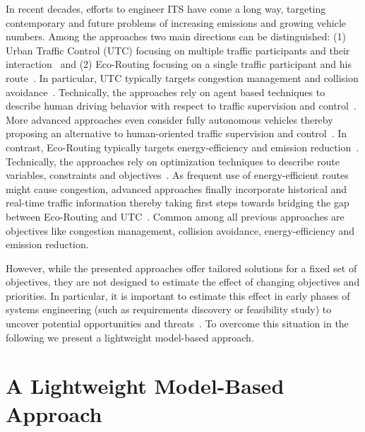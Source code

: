 \documentclass[conference]{../cls/IEEEtran}
\begin{document}
In recent decades, efforts to engineer ITS have come a long way, targeting contemporary and future problems of increasing emissions and growing vehicle numbers. Among the approaches two main directions can be distinguished: (1) Urban Traffic Control (UTC) focusing on multiple traffic participants and their interaction~\cite{Chen2010,Dresner2008} and (2) Eco-Routing focusing on a single traffic participant and his route~\cite{Ericsson2006,Boriboonsomsin2012}. In particular, UTC typically targets congestion management and collision avoidance~\cite{Chen2010}. Technically, the approaches rely on agent based techniques to describe human driving behavior with respect to traffic supervision and control~\cite{Chen2010}. More advanced approaches even consider fully autonomous vehicles thereby proposing an alternative to human-oriented traffic supervision and control~\cite{Dresner2008}. In contrast, Eco-Routing typically targets energy-efficiency and emission reduction~\cite{Ericsson2006}. Technically, the approaches rely on optimization techniques to describe route variables, constraints and objectives~\cite{Ericsson2006}. As frequent use of energy-efficient routes might cause congestion, advanced approaches finally incorporate historical and real-time traffic information thereby taking first steps towards bridging the gap between Eco-Routing and UTC~\cite{Boriboonsomsin2012}. Common among all previous approaches are objectives like congestion management, collision avoidance, energy-efficiency and emission reduction.

However, while the presented approaches offer tailored solutions for a fixed set of objectives, they are not designed to estimate the effect of changing objectives and priorities. In particular, it is important to estimate this effect in early phases of systems engineering (such as requirements discovery or feasibility study) to uncover potential opportunities and threats~\cite{Whitten2005}. To overcome this situation in the following we present a lightweight model-based approach.

\section{A Lightweight Model-Based Approach}
\label{sec:approach}
\end{document}
